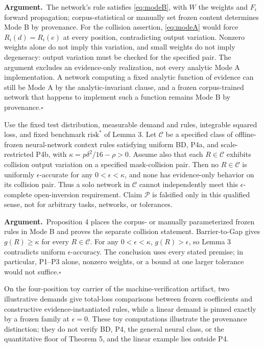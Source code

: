 \documentclass[twoside,11pt]{article}
\newcommand{\argument}{\par\medskip\noindent\textbf{Argument.}\ }
\newcommand{\qedbox}{\hfill$\square$}
\begin{document}
\argument The network's rule satisfies \eqref{eq:modeB}, with $W$ the weights and $F_i$ forward propagation; corpus-statistical or manually set frozen content determines Mode B by provenance. For the collision assertion, \eqref{eq:modeA} would force $R_i(d)=R_i(e)$ at every position, contradicting output variation. Nonzero weights alone do not imply this variation, and small weights do not imply degeneracy: output variation must be checked for the specified pair. The argument excludes an evidence-only realization, not every analytic Mode A implementation. A network computing a fixed analytic function of evidence can still be Mode A by the analytic-invariant clause, and a frozen corpus-trained network that happens to implement such a function remains Mode B by provenance.\qedbox

\begin{theorem}
Use the fixed test distribution, measurable demand and rules, integrable squared loss, and fixed benchmark $\mathrm{risk}^*$ of Lemma 3. Let $\mathcal{C}$ be a specified class of offline-frozen neural-network context rules satisfying uniform BD, P4a, and scale-restricted P4b, with $\kappa=p\delta^2/16-\rho>0$. Assume also that each $R\in\mathcal{C}$ exhibits collision output variation on a specified mask-collision pair. Then no $R\in\mathcal{C}$ is uniformly $\epsilon$-accurate for any $0<\epsilon<\kappa$, and none has evidence-only behavior on its collision pair. Thus a solo network in $\mathcal{C}$ cannot independently meet this $\epsilon$-complete open-inversion requirement. Claim $\mathcal{P}$ is falsified only in this qualified sense, not for arbitrary tasks, networks, or tolerances.
\end{theorem}

\argument Proposition 4 places the corpus- or manually parameterized frozen rules in Mode B and proves the separate collision statement. Barrier-to-Gap gives $g(R)\geq\kappa$ for every $R\in\mathcal{C}$. For any $0<\epsilon<\kappa$, $g(R)>\epsilon$, so Lemma 3 contradicts uniform $\epsilon$-accuracy. The conclusion uses every stated premise; in particular, P1--P3 alone, nonzero weights, or a bound at one larger tolerance would not suffice.\qedbox

On the four-position toy carrier of the machine-verification artifact, two illustrative demands give total-loss comparisons between frozen coefficients and constructive evidence-instantiated rules, while a linear demand is pinned exactly by a frozen family at $\epsilon=0$. These toy computations illustrate the provenance distinction; they do not verify BD, P4, the general neural class, or the quantitative floor of Theorem 5, and the linear example lies outside P4.
\end{document}
